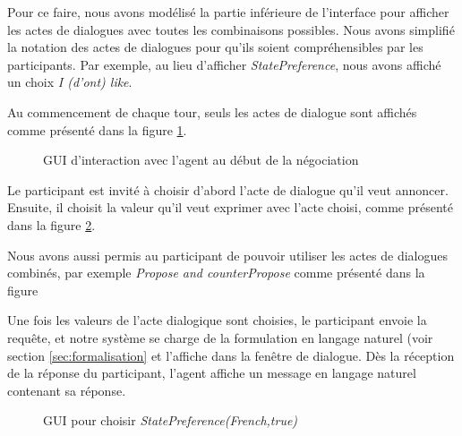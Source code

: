 {					Pour ce faire, nous avons modélisé la partie inférieure de l'interface pour afficher les actes de dialogues avec toutes les combinaisons possibles. 
					Nous avons simplifié la notation des actes de dialogues pour qu'ils soient compréhensibles par les participants. Par exemple, au lieu d'afficher \emph{StatePreference}, nous avons affiché un choix \emph{I (d'ont) like}.
					
					Au commencement de chaque tour, seuls les actes de dialogue sont affichés comme présenté dans la figure \ref{fig:commencement}. 
					\begin{figure}[t]
						\centering
						\caption{GUI d'interaction avec l'agent au début de la négociation}
						\label{fig:commencement}
					\end{figure} 
					Le participant est invité à choisir d'abord l'acte de dialogue qu'il veut annoncer. Ensuite, il choisit la valeur qu'il veut exprimer avec l'acte choisi, comme présenté dans la figure \ref{fig:statIhm}.
					
					Nous avons aussi permis au participant de pouvoir utiliser les actes de dialogues combinés, par exemple \emph{Propose and counterPropose} comme présenté dans la figure 
					
					Une fois les valeurs de l'acte dialogique sont choisies, le participant envoie la requête, et notre système se charge de la formulation en langage naturel (voir section \ref{sec:formalisation} et l'affiche dans la fenêtre de dialogue. Dès la réception de la réponse du participant, l'agent affiche un message en langage naturel contenant sa réponse. 
					
					
					
					\begin{figure}[b]
						\centering
						\caption{GUI pour choisir \emph{StatePreference(French,true)} }
						\label{fig:statIhm}
					\end{figure}
					
}
